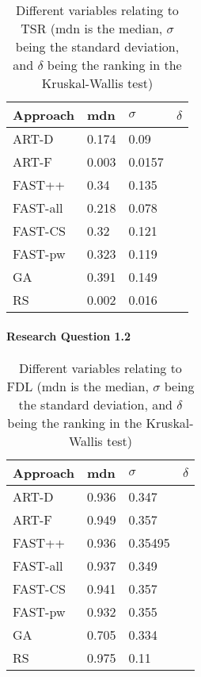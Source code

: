 \begin{table}[htpb]
	\caption[TSR statistical results, adequate]{Different variables relating to TSR (mdn is the median, $\sigma$ being the standard deviation, and $\delta$ being the ranking in the Kruskal-Wallis test)}\label{tsr_stats}
	\centering
	\begin{tabular}{l l l l}
	Approach & mdn & $\sigma$ & $\delta$ \\
	\midrule
	ART-D & 0.174 & 0.09 & \\
	ART-F & 0.003 & 0.0157 & \\
	FAST++ & 0.34 & 0.135 & \\
	FAST-all & 0.218 & 0.078 & \\
	FAST-CS & 0.32 & 0.121 & \\
	FAST-pw & 0.323 & 0.119 & \\
	GA & 0.391 & 0.149 & \\
	RS & 0.002 & 0.016 & \\
	\bottomrule
	\end{tabular}
\end{table}

\paragraph{Research Question 1.2}


\begin{table}[htpb]
	\caption[FDL statistical results, budget]{Different variables relating to FDL (mdn is the median, $\sigma$ being the standard deviation, and $\delta$ being the ranking in the Kruskal-Wallis test)}\label{tsr_stats}
	\centering
	\begin{tabular}{l l l l}
	Approach & mdn & $\sigma$ & $\delta$ \\
	\midrule
	ART-D & 0.936 & 0.347 & \\
	ART-F & 0.949 & 0.357 & \\
	FAST++ & 0.936 & 0.35495 & \\
	FAST-all & 0.937 & 0.349 & \\
	FAST-CS & 0.941 & 0.357 & \\
	FAST-pw & 0.932 & 0.355 & \\
	GA & 0.705 & 0.334 & \\
	RS & 0.975 & 0.11 & \\
	\bottomrule
	\end{tabular}
\end{table}

